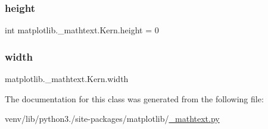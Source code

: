 \subsubsection{\texorpdfstring{height}{height}}
{\footnotesize\ttfamily int matplotlib.\+\_\+mathtext.\+Kern.\+height = 0\hspace{0.3cm}{\ttfamily [static]}}

\mbox{\label{classmatplotlib_1_1__mathtext_1_1Kern_a89837c719a9b088046b1f61c0ad489cf}} 
\subsubsection{\texorpdfstring{width}{width}}
{\footnotesize\ttfamily matplotlib.\+\_\+mathtext.\+Kern.\+width}



The documentation for this class was generated from the following file\+:\begin{DoxyCompactItemize}
\item 
venv/lib/python3./site-\/packages/matplotlib/\hyperlink{__mathtext_8py}{\+\_\+mathtext.\+py}\end{DoxyCompactItemize}
